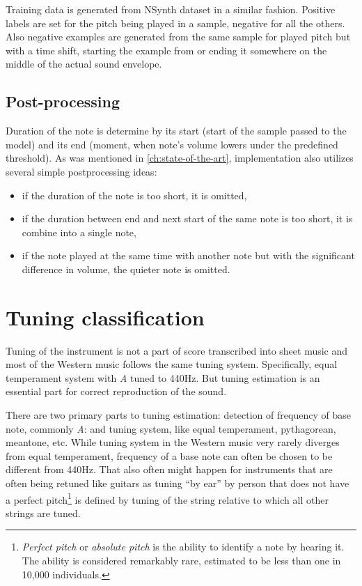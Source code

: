 Training data is generated from NSynth dataset in a similar fashion. Positive labels are set for the pitch being played
in a sample, negative for all the others. Also negative examples are generated from the same sample for played pitch but
with a time shift, starting the example from or ending it somewhere on the middle of the actual sound envelope.

\subsection{Post-processing}\label{subsec:post-processing}
Duration of the note is determine by its start (start of the sample passed to the model) and its end (moment, when
note's volume lowers under the predefined threshold). As was mentioned in \cref{ch:state-of-the-art}, implementation
also utilizes several simple postprocessing ideas:
\begin{itemize}
	\item if the duration of the note is too short, it is omitted,
	\item if the duration between end and next start of the same note is too short, it is combine into a single note,
	\item if the note played at the same time with another note but with the significant difference in volume,
	the quieter note is omitted.
\end{itemize}


\section{Tuning classification}\label{sec:tunning-classification}
Tuning of the instrument is not a part of score transcribed into sheet music and most of the Western music follows
the same tuning system. Specifically, equal temperament system with \textit{A} tuned to 440Hz. But tuning estimation is
an essential part for correct reproduction of the sound.

There are two primary parts to tuning estimation: detection of frequency of base note, commonly \textit{A}:
and tuning system, like equal temperament, pythagorean, meantone, etc. While tuning system in the Western music very
rarely diverges from equal temperament, frequency of a base note can often be chosen to be different from 440Hz. That
also often might happen for instruments that are often being retuned like guitars as tuning ``by ear'' by person that
does not have a perfect pitch\footnote{\textit{Perfect pitch} or \textit{absolute pitch} is the ability to identify
a note by hearing it. The ability is considered remarkably rare, estimated to be less than one in 10,000
individuals\cite{perfect-pitch}.} is defined by tuning of the string relative to which all other strings are tuned.

